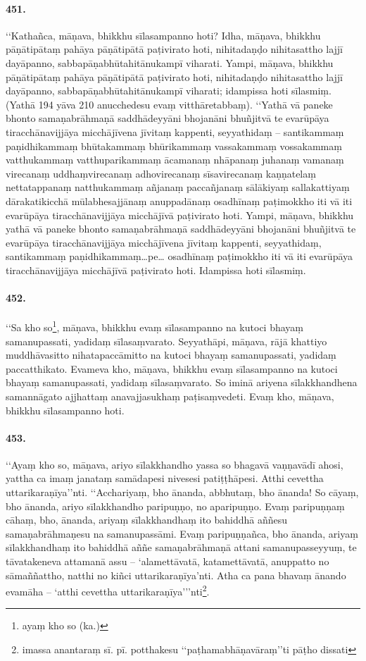 \paragraph{451.} ‘‘Kathañca, māṇava, bhikkhu sīlasampanno hoti? Idha, māṇava, bhikkhu pāṇātipātaṃ pahāya pāṇātipātā paṭivirato hoti, nihitadaṇḍo nihitasattho lajjī dayāpanno, sabbapāṇabhūtahitānukampī viharati. Yampi, māṇava, bhikkhu pāṇātipātaṃ pahāya pāṇātipātā paṭivirato hoti, nihitadaṇḍo nihitasattho lajjī dayāpanno, sabbapāṇabhūtahitānukampī viharati; idampissa hoti sīlasmiṃ. (Yathā 194 yāva 210 anucchedesu evaṃ vitthāretabbaṃ). ‘‘Yathā vā paneke bhonto samaṇabrāhmaṇā saddhādeyyāni bhojanāni bhuñjitvā te evarūpāya tiracchānavijjāya micchājīvena jīvitaṃ kappenti, seyyathidaṃ – santikammaṃ paṇidhikammaṃ bhūtakammaṃ bhūrikammaṃ vassakammaṃ vossakammaṃ vatthukammaṃ vatthuparikammaṃ ācamanaṃ nhāpanaṃ juhanaṃ vamanaṃ virecanaṃ uddhaṃvirecanaṃ adhovirecanaṃ sīsavirecanaṃ kaṇṇatelaṃ nettatappanaṃ natthukammaṃ añjanaṃ paccañjanaṃ sālākiyaṃ sallakattiyaṃ dārakatikicchā mūlabhesajjānaṃ anuppadānaṃ osadhīnaṃ paṭimokkho iti vā iti evarūpāya tiracchānavijjāya micchājīvā paṭivirato hoti. Yampi, māṇava, bhikkhu yathā vā paneke bhonto samaṇabrāhmaṇā saddhādeyyāni bhojanāni bhuñjitvā te evarūpāya tiracchānavijjāya micchājīvena jīvitaṃ kappenti, seyyathidaṃ, santikammaṃ paṇidhikammaṃ…pe… osadhīnaṃ paṭimokkho iti vā iti evarūpāya tiracchānavijjāya micchājīvā paṭivirato hoti. Idampissa hoti sīlasmiṃ.

\paragraph{452.} ‘‘Sa kho so\footnote{ayaṃ kho so (ka.)}, māṇava, bhikkhu evaṃ sīlasampanno na kutoci bhayaṃ samanupassati, yadidaṃ sīlasaṃvarato. Seyyathāpi, māṇava, rājā khattiyo muddhāvasitto nihatapaccāmitto na kutoci bhayaṃ samanupassati, yadidaṃ paccatthikato. Evameva kho, māṇava, bhikkhu evaṃ sīlasampanno na kutoci bhayaṃ samanupassati, yadidaṃ sīlasaṃvarato. So iminā ariyena sīlakkhandhena samannāgato ajjhattaṃ anavajjasukhaṃ paṭisaṃvedeti. Evaṃ kho, māṇava, bhikkhu sīlasampanno hoti.

\paragraph{453.} ‘‘Ayaṃ kho so, māṇava, ariyo sīlakkhandho yassa so bhagavā vaṇṇavādī ahosi, yattha ca imaṃ janataṃ samādapesi nivesesi patiṭṭhāpesi. Atthi cevettha uttarikaraṇīya’’nti. ‘‘Acchariyaṃ, bho ānanda, abbhutaṃ, bho ānanda! So cāyaṃ, bho ānanda, ariyo sīlakkhandho paripuṇṇo, no aparipuṇṇo. Evaṃ paripuṇṇaṃ cāhaṃ, bho, ānanda, ariyaṃ sīlakkhandhaṃ ito bahiddhā aññesu samaṇabrāhmaṇesu na samanupassāmi. Evaṃ paripuṇṇañca, bho ānanda, ariyaṃ sīlakkhandhaṃ ito bahiddhā aññe samaṇabrāhmaṇā attani samanupasseyyuṃ, te tāvatakeneva attamanā assu – ‘alamettāvatā, katamettāvatā, anuppatto no sāmaññattho, natthi no kiñci uttarikaraṇīya’nti. Atha ca pana bhavaṃ ānando evamāha – ‘atthi cevettha uttarikaraṇīya’’’nti\footnote{imassa anantaraṃ sī. pī. potthakesu ‘‘paṭhamabhāṇavāraṃ’’ti pāṭho dissati}.

